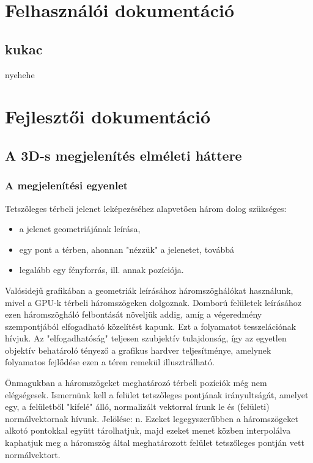 \documentclass[12pt,oneside]{book}
\begin{document}

\chapter{Felhasználói dokumentáció}
\section{kukac}
nyehehe


\chapter{Fejlesztői dokumentáció}

\section{A 3D-s megjelenítés elméleti háttere}

\subsection{A megjelenítési egyenlet}

Tetszőleges térbeli jelenet leképezéséhez alapvetően három dolog szükséges:

\begin{itemize}[noitemsep]
\item a jelenet geometriájának leírása,
\item egy pont a térben, ahonnan "nézzük" a jelenetet, továbbá
\item legalább egy fényforrás, ill. annak pozíciója.
\end{itemize}

Valósidejű grafikában a geometriák leírásához háromszöghálókat használunk, mivel a GPU-k térbeli háromszögeken dolgoznak. Domború felületek leírásához ezen háromszögháló felbontását növeljük addig, amíg a végeredmény szempontjából elfogadható közelítést kapunk. Ezt a folyamatot tesszelációnak hívjuk. Az "elfogadhatóság" teljesen szubjektív tulajdonság, így az egyetlen objektív behatároló tényező a grafikus hardver teljesítménye, amelynek folyamatos fejlődése ezen a téren remekül illusztrálható.


Önmagukban a háromszögeket meghatározó térbeli pozíciók még nem elégségesek. Ismernünk kell a felület tetszőleges pontjának irányultságát, amelyet egy, a felületből "kifelé" álló, normalizált vektorral írunk le és (felületi) normálvektornak hívunk. Jelölése: n.
Ezeket legegyszerűbben a háromszögeket alkotó pontokkal együtt tárolhatjuk, majd ezeket menet közben interpolálva kaphatjuk meg a háromszög által meghatározott felület tetszőleges pontján vett normálvektort.
\end{document}
